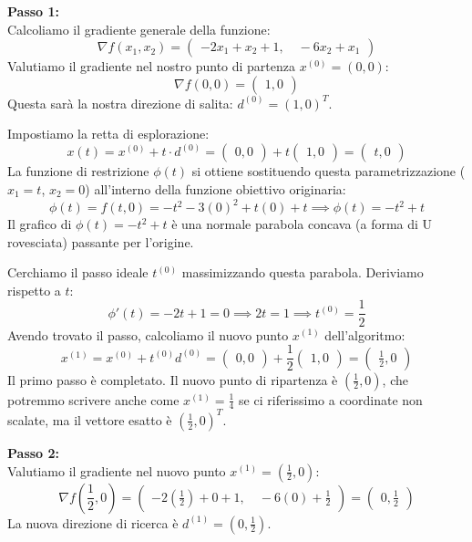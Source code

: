 \documentclass[12pt, a4paper]{article}
\begin{document}
	\textbf{Passo 1:}\\
	Calcoliamo il gradiente generale della funzione:
	\[ \nabla f(x_1, x_2) = \begin{pmatrix} -2x_1 + x_2 + 1\boldsymbol{,} \quad -6x_2 + x_1 \end{pmatrix} \]
	Valutiamo il gradiente nel nostro punto di partenza $x^{(0)} = (0,0)$:
	\[ \nabla f(0,0) = \begin{pmatrix} 1, 0 \end{pmatrix} \]
	Questa sarà la nostra direzione di salita: $d^{(0)} = (1,0)^T$.
	
	Impostiamo la retta di esplorazione:
	\[ x(t) = x^{(0)} + t \cdot d^{(0)} = \begin{pmatrix} 0, 0 \end{pmatrix} + t \begin{pmatrix} 1, 0 \end{pmatrix} = \begin{pmatrix} t, 0 \end{pmatrix} \]
	La funzione di restrizione $\phi(t)$ si ottiene sostituendo questa parametrizzazione ($x_1 = t$, $x_2 = 0$) all'interno della funzione obiettivo originaria:
	\[ \phi(t) = f(t, 0) = -t^2 - 3(0)^2 + t(0) + t \implies \phi(t) = -t^2 + t \]
	Il grafico di $\phi(t) = -t^2 + t$ è una normale parabola concava (a forma di U rovesciata) passante per l'origine. 
	
	Cerchiamo il passo ideale $t^{(0)}$ massimizzando questa parabola. Deriviamo rispetto a $t$:
	\[ \phi'(t) = -2t + 1 = 0 \implies 2t = 1 \implies t^{(0)} = \frac{1}{2} \]
	Avendo trovato il passo, calcoliamo il nuovo punto $x^{(1)}$ dell'algoritmo:
	\[ x^{(1)} = x^{(0)} + t^{(0)} d^{(0)} = \begin{pmatrix} 0, 0 \end{pmatrix} + \frac{1}{2} \begin{pmatrix} 1, 0 \end{pmatrix} = \begin{pmatrix} \frac{1}{2}, 0 \end{pmatrix} \]
	Il primo passo è completato. Il nuovo punto di ripartenza è $(\frac{1}{2}, 0)$, che potremmo scrivere anche come $x^{(1)} = \frac{1}{4}$ se ci riferissimo a coordinate non scalate, ma il vettore esatto è $(\frac{1}{2}, 0)^T$.
	
	\vspace{0.4cm}
	\textbf{Passo 2:}\\
	Valutiamo il gradiente nel nuovo punto $x^{(1)} = (\frac{1}{2}, 0)$:
	\[ \nabla f(\frac{1}{2}, 0) = \begin{pmatrix} -2(\frac{1}{2}) + 0 + 1\boldsymbol{,} \quad -6(0) + \frac{1}{2} \end{pmatrix} = \begin{pmatrix} 0, \frac{1}{2} \end{pmatrix} \]
	La nuova direzione di ricerca è $d^{(1)} = (0, \frac{1}{2})$.
	
\end{document}

